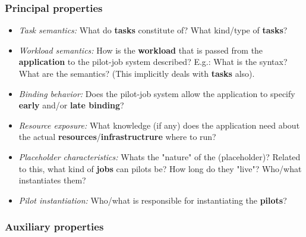 \documentclass{sig-alternate}
\begin{document}
\subsubsection{Principal properties}
\begin{itemize}

\item \textit{Task semantics:} What do \textbf{tasks} constitute of? What
kind/type of \textbf{tasks}?

\item \textit{Workload semantics:} How is the \textbf{workload} that is passed
from the \textbf{application} to the pilot-job system described? E.g.: What is
the syntax? What are the semantics? (This implicitly deals with \textbf{tasks}
also).

\item \textit{Binding behavior:} Does the pilot-job system allow the application to specify \textbf{early}
and/or \textbf{late binding}?

\item \textit{Resource exposure:} What knowledge (if any) does the application need
about the actual \textbf{resources}/\textbf{infrastructrure} where to run?

\item \textit{Placeholder characteristics:} Whats the "nature" of the \textbf{\pilot}
(placeholder)? Related to this, what kind of \textbf{jobs} can pilots be? How
long do they "live"? Who/what instantiates them?

\item \textit{Pilot instantiation:} Who/what is responsible for instantiating
the \textbf{pilots}?
\end{itemize}

\subsubsection{Auxiliary properties}
\end{document}
